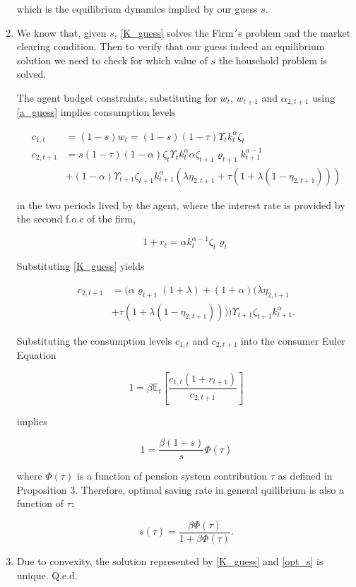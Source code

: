 \documentclass[12pt,a4paper]{article}
\begin{document}
\begin{enumerate}
  which is the equilibrium dynamics implied by our guess $s$.

  \item We know that, given $s$, \ref{K_guess} solves the Firm´s problem and the market clearing condition. Then to verify that our guess indeed an equilibrium solution we need to check for which value of $s$ the household problem is solved.

  The agent budget constraints, substituting for $w_t$, $w_{t + 1}$ and $\alpha_{2, t+1}$ using \ref{a_guess} implies consumption levels

    \begin{align*}
      c_{1,t}& = (1 - s) w_t =(1 - s)(1 - \tau) \Upsilon_t k_t^\alpha \zeta_t  \\
      c_{2,t+1} & = s(1 - \tau) (1 - \alpha)\zeta_{t} \Upsilon_t k_t^\alpha \alpha \zeta_{t+1} \varrho_{t+1} k_{t+1}^{\alpha - 1}   \\
      & + (1 - \alpha) \Upsilon_{t+1}\zeta_{t+1} k_{t+1}^{\alpha} (\lambda \eta_{2, t+1} + \tau (1 + \lambda(1 - \eta_{2, t+1})))
    \end{align*}

  in the two periods lived by the agent, where the interest rate is provided by the second f.o.c of the firm,

  \[
    1 + r_t = \alpha k_t^{\alpha - 1} \zeta_{t} \varrho_{t}
  \]

  Substituting \ref{K_guess} yields

    \begin{align*}
     c_{2,t+1} & = (\alpha \varrho_{t+1} (1 + \lambda) + (1 + \alpha)(\lambda \eta_{2, t+1}  \\
     & + \tau(1 + \lambda(1 - \eta_{2, t+1})))) \Upsilon_{t+1}\zeta_{t+1} k_{t+1}^{\alpha}.
    \end{align*}

  Substituting the consumption levels $c_{1,t}$ and $c_{2,t+1}$ into the consumer Euler Equation

    \[
      1 = \beta \mathbb{E}_t \left[ \frac{c_{1,t} (1+r_{t+1})}{c_{2,t+1}} \right]
    \]

  implies

    \[
    1 =  \frac{\beta(1 - s)}{s}\Phi(\tau)
    \]

  where $\Phi(\tau)$ is a function of pension system contribution $\tau$ as defined in Proposition 3. Therefore, optimal saving rate in general quilibrium is also a function of $\tau$:

    \begin{equation}
      s(\tau) = \frac{\beta \Phi(\tau)}{1 + \beta \Phi(\tau)}.
      \label{opt_s}
    \end{equation}

  \item Due to convexity, the solution represented by \ref{K_guess} and \ref{opt_s} is unique.  Q.e.d.

\end{enumerate}


%

\pagebreak
\end{document}
